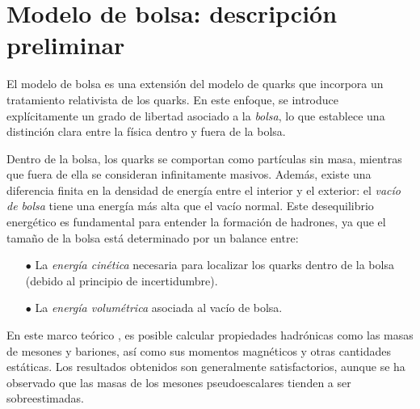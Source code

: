 %
%
%
%


\section{Modelo de bolsa: descripción preliminar}

El modelo de bolsa es una extensión del modelo de quarks que incorpora un tratamiento relativista de los quarks. En este enfoque, se introduce explícitamente un grado de libertad asociado a la \emph{bolsa}, lo que establece una distinción clara entre la física dentro y fuera de la bolsa.

Dentro de la bolsa, los quarks se comportan como partículas sin masa, mientras que fuera de ella se consideran infinitamente masivos. Además, existe una diferencia finita en la densidad de energía entre el interior y el exterior: el \emph{vacío de bolsa} tiene una energía más alta que el vacío normal. Este desequilibrio energético es fundamental para entender la formación de hadrones, ya que el tamaño de la bolsa está determinado por un balance entre:
\begin{itemize}
    \item[$\bullet$] La \emph{energía cinética} necesaria para localizar los quarks dentro de la bolsa (debido al principio de incertidumbre).
    \item[$\bullet$] La \emph{energía volumétrica} asociada al vacío de bolsa.
\end{itemize}  %

En este marco teórico \cite{Chodos_1974}, es posible calcular propiedades hadrónicas como las masas de mesones y bariones, así como sus momentos magnéticos y otras cantidades estáticas. Los resultados obtenidos son generalmente satisfactorios, aunque se ha observado que las masas de los mesones pseudoescalares tienden a ser sobreestimadas. %


